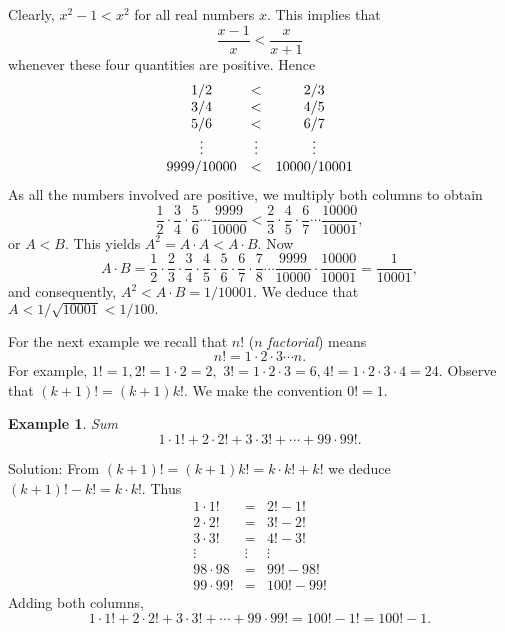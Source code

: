 \documentclass[11pt, openany]{book}
\theoremstyle{change} \theoremheaderfont{\blue\sffamily\bfseries}
\newtheorem{exa}[thm]{Example}
\theoremstyle{nonumberplain} \theoremheaderfont{\sffamily\bfseries}
\newcommand{\í}{\'{\i}}
\begin{document}
Clearly, $x^2 - 1 < x^2$  for all real numbers $x$. This implies
that
$$\frac{x - 1}{x} < \frac{x}{x + 1}$$ whenever these four quantities are
positive. Hence
$${\everymath{\displaystyle}\begin{array}{ccc}
{1}/{2} & < & {2}/{3} \\
{3}/{4} & < & {4}/{5} \\
{5}/{6} & < & {6}/{7} \\
\vdots & \vdots & \vdots \\
{9999}/{10000} & < & {10000}/{10001} \\
\end{array} }$$
As all the numbers involved are positive, we multiply both columns
to obtain
$$\frac{1}{2}\cdot\frac{3}{4}\cdot\frac{5}{6}\cdots \frac{9999}{10000}
<
\frac{2}{3}\cdot\frac{4}{5}\cdot\frac{6}{7}\cdots\frac{10000}{10001},$$
or $A < B.$ This yields $A^2 = A\cdot A < A\cdot B.$ Now
$$A\cdot B = \frac{1}{2}\cdot\frac{2}{3}\cdot\frac{3}{4}\cdot\frac{4}{5}\cdot\frac{5}{6}\cdot\frac{6}{7}
\cdot\frac{7}{8}\cdots\frac{9999}{10000}\cdot\frac{10000}{10001} =
\frac{1}{10001},$$ and consequently, $A^2 < A\cdot B = 1/10001.$
We deduce that $A < 1/\sqrt{10001} < 1/100.$

For the next example we recall that $n!$ ($n$ {\em factorial})
means
$$n! = 1\cdot 2\cdot 3\cdots n.$$For example, $1! = 1, 2!= 1\cdot 2 = 2,$
$3! = 1\cdot 2 \cdot 3 = 6, 4! = 1\cdot 2\cdot 3\cdot 4 = 24.$
Observe that $(k + 1)! = (k + 1)k!.$ We make the convention $0! =
1.$
\begin{exa} Sum
$$ 1\cdot 1! + 2\cdot 2! + 3\cdot 3! + \cdots + 99\cdot 99!.$$
\end{exa}
Solution: From $(k + 1)! = (k + 1)k! = k\cdot k! + k!$ we deduce
$(k + 1)! - k! = k\cdot k!.$ Thus
$$
\begin{array}{lcl}
1\cdot 1! & = &  2! - 1! \\
2\cdot 2! & = & 3! - 2! \\
3\cdot 3! & = & 4! - 3! \\
\vdots & \vdots & \vdots \\
98\cdot 98 & = & 99! - 98! \\
99\cdot 99! & = &  100! - 99!
\end{array}
$$
Adding both columns,
$$1\cdot 1! + 2\cdot 2! + 3\cdot 3! + \cdots + 99\cdot 99! = 100! - 1! = 100! - 1.$$
\end{document}
